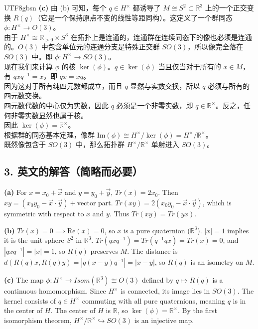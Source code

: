 \documentclass{article}
\begin{document}
\begin{CJK*}{UTF8}{gbsn}
\textbf{(c)} 由 (b) 可知，每个 $q \in H^\times$ 都诱导了 $M \cong S^2 \subset \mathbb{R}^3$ 上的一个正交变换 $R(q)$（它是一个保持原点不变的线性等距同构）。这定义了一个群同态 $\phi: H^\times \to O(3)$。\\
由于 $H^\times \cong \mathbb{R}_{>0} \times S^3$ 在拓扑上是连通的，连通群在连续同态下的像也必须是连通的。$O(3)$ 中包含单位元的连通分支是特殊正交群 $SO(3)$，所以像完全落在 $SO(3)$ 中。即 $\phi: H^\times \to SO(3)$。\\
现在我们来计算 $\phi$ 的核 $\ker(\phi)$。$q \in \ker(\phi)$ 当且仅当对于所有的 $x \in M$，有 $qxq^{-1} = x$，即 $qx = xq$。\\
因为这对于所有纯四元数都成立，而且 $q$ 显然与实数交换，所以 $q$ 必须与所有的四元数交换。\\
四元数代数的中心仅为实数，因此 $q$ 必须是一个非零实数，即 $q \in \mathbb{R}^\times$。反之，任何非零实数显然也属于核。\\
因此 $\ker(\phi) = \mathbb{R}^\times$。\\
根据群的同态基本定理，像群 $\text{Im}(\phi) \cong H^\times / \ker(\phi) = H^\times / \mathbb{R}^\times$。\\
既然像包含于 $SO(3)$ 中，那么拓扑群 $H^\times / \mathbb{R}^\times$ 单射进入 $SO(3)$。

\subsection*{3. 英文的解答（简略而必要）}
\textbf{(a)} For $x = x_0 + \vec{x}$ and $y = y_0 + \vec{y}$, $Tr(x) = 2x_0$. Then $xy = (x_0y_0 - \vec{x}\cdot\vec{y}) + \text{vector part}$. $Tr(xy) = 2(x_0y_0 - \vec{x}\cdot\vec{y})$, which is symmetric with respect to $x$ and $y$. Thus $Tr(xy) = Tr(yx)$.

\textbf{(b)} $Tr(x) = 0 \implies \text{Re}(x) = 0$, so $x$ is a pure quaternion ($\mathbb{R}^3$). $|x|=1$ implies it is the unit sphere $S^2$ in $\mathbb{R}^3$.
$Tr(qxq^{-1}) = Tr(q^{-1}qx) = Tr(x) = 0$, and $|qxq^{-1}| = |x| = 1$, so $R(q)$ preserves $M$.
The distance is $d(R(q)x, R(q)y) = |q(x-y)q^{-1}| = |x-y|$, so $R(q)$ is an isometry on $M$.

\textbf{(c)} The map $\phi: H^\times \to Isom(\mathbb{R}^3) \cong O(3)$ defined by $q \mapsto R(q)$ is a continuous homomorphism. Since $H^\times$ is connected, its image lies in $SO(3)$. The kernel consists of $q \in H^\times$ commuting with all pure quaternions, meaning $q$ is in the center of $H$. The center of $H$ is $\mathbb{R}$, so $\ker(\phi) = \mathbb{R}^\times$. By the first isomorphism theorem, $H^\times / \mathbb{R}^\times \hookrightarrow SO(3)$ is an injective map.

\end{CJK*}
\end{document}
